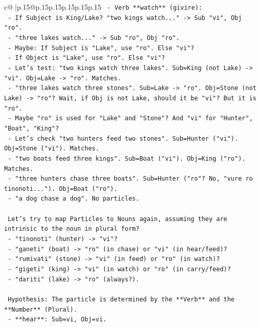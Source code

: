 \documentclass{article}
\begin{document}
{\begin{supertabular}{c@{$\;$}|p{.15\linewidth}@{}p{.15\linewidth}p{.15\linewidth}p{.15\linewidth}p{.15\linewidth}p{.15\linewidth}}
{{{\texttt{    {-} Verb **watch** (givire):} \\
\texttt{        {-} If Subject is King/Lake? "two kings watch..." {-}> Sub "vi", Obj "ro".} \\
\texttt{        {-} "three lakes watch..." {-}> Sub "ro", Obj "ro".} \\
\texttt{        {-} Maybe: If Subject is "Lake", use "ro". Else "vi"?} \\
\texttt{        {-} If Object is "Lake", use "ro". Else "vi"?} \\
\texttt{        {-} Let's test: "two kings watch three lakes". Sub=King (not Lake) {-}> "vi". Obj=Lake {-}> "ro". Matches.} \\
\texttt{        {-} "three lakes watch three stones". Sub=Lake {-}> "ro". Obj=Stone (not Lake) {-}> "ro"? Wait, if Obj is not Lake, should it be "vi"? But it is "ro".} \\
\texttt{        {-} Maybe "ro" is used for "Lake" and "Stone"? And "vi" for "Hunter", "Boat", "King"?} \\
\texttt{        {-} Let's check "two hunters feed two stones". Sub=Hunter ("vi"). Obj=Stone ("vi"). Matches.} \\
\texttt{        {-} "two boats feed three kings". Sub=Boat ("vi"). Obj=King ("ro"). Matches.} \\
\texttt{        {-} "three hunters chase three boats". Sub=Hunter ("ro"? No, "vure ro tinonoti..."). Obj=Boat ("ro").} \\
\texttt{        {-} "a dog chase a dog". No particles.} \\
\\ 
\texttt{    Let's try to map Particles to Nouns again, assuming they are intrinsic to the noun in plural form?} \\
\texttt{    {-} "tinonoti" (hunter) {-}> "vi"?} \\
\texttt{    {-} "ganeti" (boat) {-}> "ro" (in chase) or "vi" (in hear/feed)?} \\
\texttt{    {-} "rumivati" (stone) {-}> "vi" (in feed) or "ro" (in watch)?} \\
\texttt{    {-} "gigeti" (king) {-}> "vi" (in watch) or "ro" (in carry/feed)?} \\
\texttt{    {-} "dariti" (lake) {-}> "ro" (always?).} \\
\\ 
\texttt{    Hypothesis: The particle is determined by the **Verb** and the **Number** (Plural).} \\
\texttt{    {-} **hear**: Sub=vi, Obj=vi.} \\
}}}
\end{supertabular}}
\end{document}
